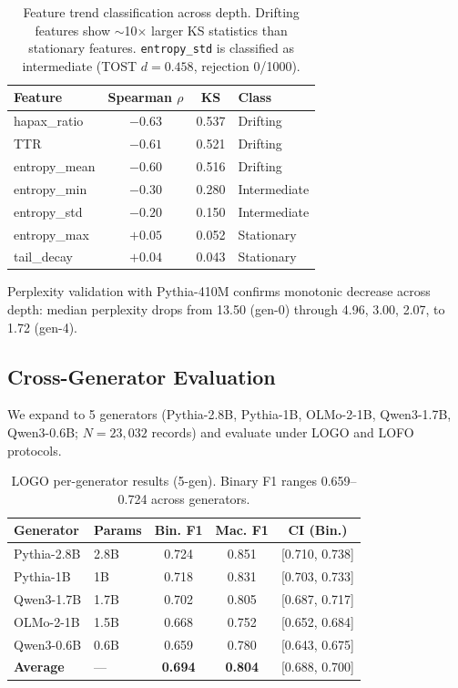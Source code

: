 \documentclass[11pt,a4paper]{article}
\begin{document}
\begin{table}[t]
\centering
\small
\begin{tabular}{lccl}
\toprule
\textbf{Feature} & \textbf{Spearman $\rho$} & \textbf{KS} & \textbf{Class} \\
\midrule
hapax\_ratio & $-0.63$ & 0.537 & Drifting \\
TTR & $-0.61$ & 0.521 & Drifting \\
entropy\_mean & $-0.60$ & 0.516 & Drifting \\
entropy\_min & $-0.30$ & 0.280 & Intermediate \\
entropy\_std & $-0.20$ & 0.150 & Intermediate \\
entropy\_max & $+0.05$ & 0.052 & Stationary \\
tail\_decay & $+0.04$ & 0.043 & Stationary \\
\bottomrule
\end{tabular}
\caption{Feature trend classification across depth. Drifting features show $\sim$10$\times$ larger KS statistics than stationary features. \texttt{entropy\_std} is classified as intermediate (TOST $d = 0.458$, rejection 0/1000).}
\label{tab:trend}
\end{table}

Perplexity validation with Pythia-410M confirms monotonic decrease across depth: median perplexity drops from 13.50 (gen-0) through 4.96, 3.00, 2.07, to 1.72 (gen-4).

\subsection{Cross-Generator Evaluation}
\label{sec:cross_gen}

We expand to 5 generators (Pythia-2.8B, Pythia-1B, OLMo-2-1B, Qwen3-1.7B, Qwen3-0.6B; $N = 23{,}032$ records) and evaluate under LOGO and LOFO protocols.

\begin{table}[t]
\centering
\small
\begin{tabular}{llccc}
\toprule
\textbf{Generator} & \textbf{Params} & \textbf{Bin. F1} & \textbf{Mac. F1} & \textbf{CI (Bin.)} \\
\midrule
Pythia-2.8B & 2.8B & 0.724 & 0.851 & [0.710, 0.738] \\
Pythia-1B & 1B & 0.718 & 0.831 & [0.703, 0.733] \\
Qwen3-1.7B & 1.7B & 0.702 & 0.805 & [0.687, 0.717] \\
OLMo-2-1B & 1.5B & 0.668 & 0.752 & [0.652, 0.684] \\
Qwen3-0.6B & 0.6B & 0.659 & 0.780 & [0.643, 0.675] \\
\midrule
\textbf{Average} & — & \textbf{0.694} & \textbf{0.804} & [0.688, 0.700] \\
\bottomrule
\end{tabular}
\caption{LOGO per-generator results (5-gen). Binary F1 ranges 0.659--0.724 across generators.}
\label{tab:logo}
\end{table}
\end{document}
